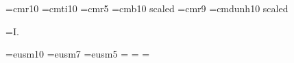 

\font\dotless=cmr10 %
\font\itdotless=cmti10
\def\itumi{{\"{\itdotless\char'020}}}
\def\itumj{{\"{\itdotless\char'021}}}
\def\umi{{\"{\dotless\char'020}}}
\def\umj{{\"{\dotless\char'021}}}
\font\smaller=cmr5
\font\boldtitlefont=cmb10 scaled
\font\ninerm=cmr9
\font\dun=cmdunh10 scaled

\footline={\hfil {\tenrm I.\folio}\hfil}

\def\eps{{\varepsilon}}
\def\kap{{\kappa}}
\def\lam{{\lambda}}

\def\undertext#1{$\underline{\vphantom{y}\hbox{#1}}$}
\def\nspace{\lineskip=1pt\baselineskip=12pt%
     \lineskiplimit=0pt}
\def\dspace{\lineskip=2pt\baselineskip=18pt%
     \lineskiplimit=0pt}

\def\w{{\mathchoice{\,{\scriptstyle\wedge}\,}
  {{\scriptstyle\wedge}}
  {{\scriptscriptstyle\wedge}}{{\scriptscriptstyle\wedge}}}}
\def\plus{{\scriptscriptstyle +}}
\def\xdot{\dot{x}}

\def\Diff{\rm Diff} \def\Area{\hbox{\rm Area}}
\def\Map{\rm Diff}  \def\Met{\rm Met}
\def\Maps{\rm Maps} \def\Vol{\rm Vol}
\def\SU{\rm SU}

\def\fbar{\bar{f}}
\def\kbar{\bar{k}}
\def\zbar{\bar{z}}
\def\Abar{\bar{A}}
\def\Sbar{\bar{S}}





\def\db#1{{\fam\msbfam\relax#1}}

\def\dbA{{\db A}} \def\dbB{{\db B}}
\def\dbC{{\db C}} \def\dbD{{\db D}}
\def\dbE{{\db E}} \def\dbF{{\db F}}
\def\dbG{{\db G}} \def\dbH{{\db H}}
\def\dbI{{\db I}} \def\dbJ{{\db J}}
\def\dbK{{\db K}} \def\dbL{{\db L}}
\def\dbM{{\db M}} \def\dbN{{\db N}}
\def\dbO{{\db O}} \def\dbP{{\db P}}
\def\dbQ{{\db Q}} \def\dbR{{\db R}}
\def\dbS{{\db S}} \def\dbT{{\db T}}
\def\dbU{{\db U}} \def\dbV{{\db V}}
\def\dbW{{\db W}} \def\dbX{{\db X}}
\def\dbY{{\db Y}} \def\dbZ{{\db Z}}

\font\teneusm=eusm10  \font\seveneusm=eusm7 
\font\fiveeusm=eusm5 
\newfam\eusmfam 
\textfont\eusmfam=\teneusm 
\scriptfont\eusmfam=\seveneusm 
\scriptscriptfont\eusmfam=\fiveeufm 
\def\scr#1{{\fam\eusmfam\relax#1}}


